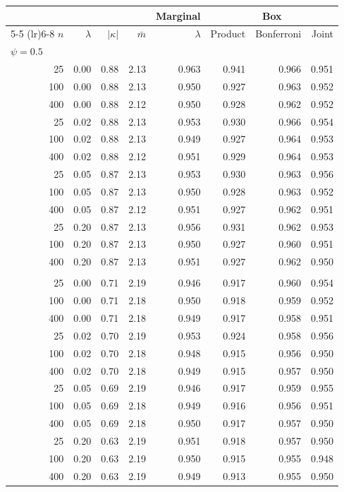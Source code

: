 \begin{tabular}{rrrrrrrr}
\toprule
 & & & & \multicolumn{1}{c}{Marginal} & \multicolumn{3}{c}{Box} \\
\cmidrule(lr){5-5} \cmidrule(lr){6-8}
$n$ & $\lambda$ & $|\kappa|$ & $\bar m$ & $\lambda$ & Product & Bonferroni & Joint \\
\midrule
\multicolumn{8}{l}{$\psi = 0.5$} \\
25 & 0.00 & 0.88 & 2.13 & 0.963 & 0.941 & 0.966 & 0.951 \\
100 & 0.00 & 0.88 & 2.13 & 0.950 & 0.927 & 0.963 & 0.952 \\
400 & 0.00 & 0.88 & 2.12 & 0.950 & 0.928 & 0.962 & 0.952 \\
25 & 0.02 & 0.88 & 2.13 & 0.953 & 0.930 & 0.966 & 0.954 \\
100 & 0.02 & 0.88 & 2.13 & 0.949 & 0.927 & 0.964 & 0.953 \\
400 & 0.02 & 0.88 & 2.12 & 0.951 & 0.929 & 0.964 & 0.953 \\
25 & 0.05 & 0.87 & 2.13 & 0.953 & 0.930 & 0.963 & 0.956 \\
100 & 0.05 & 0.87 & 2.13 & 0.950 & 0.928 & 0.963 & 0.952 \\
400 & 0.05 & 0.87 & 2.12 & 0.951 & 0.927 & 0.962 & 0.951 \\
25 & 0.20 & 0.87 & 2.13 & 0.956 & 0.931 & 0.962 & 0.953 \\
100 & 0.20 & 0.87 & 2.13 & 0.950 & 0.927 & 0.960 & 0.951 \\
400 & 0.20 & 0.87 & 2.13 & 0.951 & 0.927 & 0.962 & 0.950 \\
\addlinespace
\multicolumn{8}{l}{$\psi = 1.25$} \\
25 & 0.00 & 0.71 & 2.19 & 0.946 & 0.917 & 0.960 & 0.954 \\
100 & 0.00 & 0.71 & 2.18 & 0.950 & 0.918 & 0.959 & 0.952 \\
400 & 0.00 & 0.71 & 2.18 & 0.949 & 0.917 & 0.958 & 0.951 \\
25 & 0.02 & 0.70 & 2.19 & 0.953 & 0.924 & 0.958 & 0.956 \\
100 & 0.02 & 0.70 & 2.18 & 0.948 & 0.915 & 0.956 & 0.950 \\
400 & 0.02 & 0.70 & 2.18 & 0.949 & 0.915 & 0.957 & 0.950 \\
25 & 0.05 & 0.69 & 2.19 & 0.946 & 0.917 & 0.959 & 0.955 \\
100 & 0.05 & 0.69 & 2.18 & 0.949 & 0.916 & 0.956 & 0.951 \\
400 & 0.05 & 0.69 & 2.18 & 0.950 & 0.917 & 0.957 & 0.950 \\
25 & 0.20 & 0.63 & 2.19 & 0.951 & 0.918 & 0.957 & 0.950 \\
100 & 0.20 & 0.63 & 2.19 & 0.950 & 0.915 & 0.955 & 0.948 \\
400 & 0.20 & 0.63 & 2.19 & 0.949 & 0.913 & 0.955 & 0.950 \\
\bottomrule
\end{tabular}
